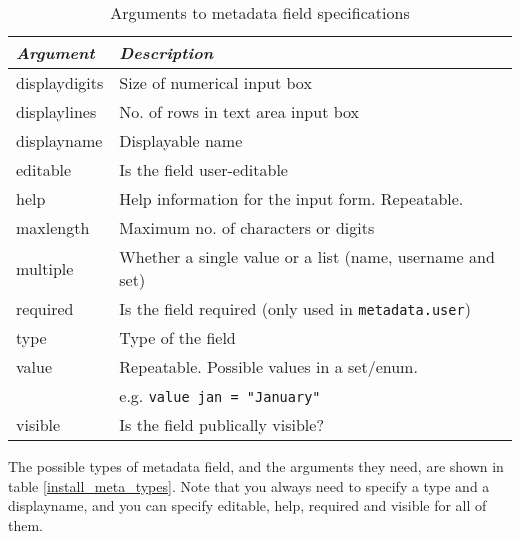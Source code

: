 \begin{table}
\begin{center}
\begin{tabular}{|l|l|}
\hline
\emph{Argument} & \emph{Description}                                       \\
\hline
displaydigits   & Size of numerical input box                              \\
displaylines    & No. of rows in text area input box                       \\
displayname     & Displayable name                                         \\
editable        & Is the field user-editable                               \\
help            & Help information for the input form. Repeatable.         \\
maxlength       & Maximum no. of characters or digits                      \\
multiple        & Whether a single value or a list (name, username and set) \\
required        & Is the field required (only used in {\tt metadata.user}) \\
type            & Type of the field                                        \\
value           & Repeatable. Possible values in a set/enum.               \\
                & e.g. {\tt value jan = "January"}                         \\
visible         & Is the field publically visible?                         \\
\hline
\end{tabular}
\caption{\label{install_meta_args} Arguments to metadata field specifications}
\end{center}
\end{table}

The possible types of metadata field, and the arguments they need, are shown in table \ref{install_meta_types}. Note that you always need to specify a type and a displayname, and you can specify editable, help, required and visible for all of them.

